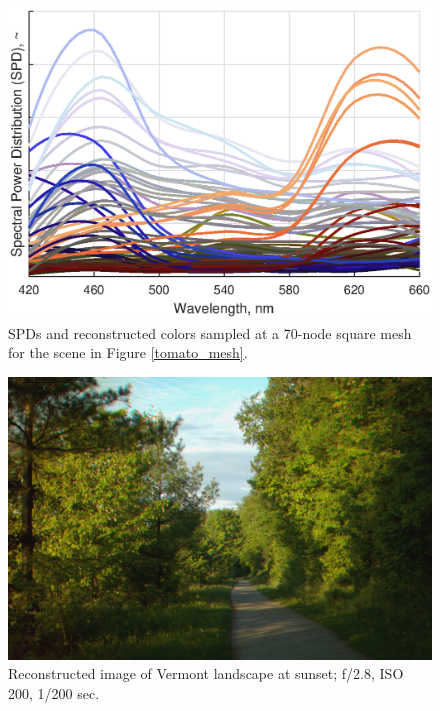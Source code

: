 \documentclass[twocolumn,10pt]{asme2ej}
\begin{document}
\begin{figure}[H]
\begin{centering}
  \includegraphics[width=1.00\linewidth]{broccoli_bottle_tomato.eps}
  \caption{SPDs and reconstructed colors sampled at a 70-node square mesh for the scene in Figure \ref{tomato_mesh}.}
  \label{tomato_SPDs}
  \end{centering}
\end{figure}

\begin{figure}[H]
\begin{centering}
  \includegraphics[width=1.00\linewidth]{vermont_path.jpg}
  \caption{Reconstructed image of Vermont landscape at sunset; f/2.8, ISO 200, 1/200 sec.}
  \label{path_mesh}
  \end{centering}
\end{figure}
\end{document}
